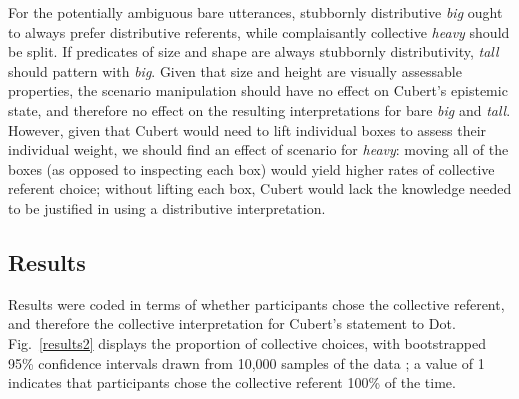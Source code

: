 \documentclass[linguex]{sp}
\begin{document}
For the potentially ambiguous bare utterances, stubbornly distributive \emph{big} ought to always prefer distributive referents, while complaisantly collective \emph{heavy} should be split. If predicates of size and shape are always stubbornly distributivity, \emph{tall} should pattern with \emph{big}. Given that size and height are visually assessable properties, the scenario manipulation should have no effect on Cubert's epistemic state, and therefore no effect on the resulting interpretations for bare \emph{big} and \emph{tall}. 
However, given that Cubert would need to lift individual boxes to assess their individual weight, we should find an effect of scenario for \emph{heavy}: moving all of the boxes (as opposed to inspecting each box) would yield higher rates of collective referent choice; without lifting each box, Cubert would lack the knowledge needed to be justified in using a distributive interpretation.

\subsection{Results}

Results were coded in terms of whether participants chose the collective referent, and therefore the collective interpretation for Cubert's statement to Dot. Fig.\ \ref{results2} displays the proportion of collective choices, with bootstrapped 95\% confidence intervals drawn from 10,000 samples of the data \citep{diciccioefron1996}; a value of 1 indicates that participants chose the collective referent 100\% of the time.
\end{document}
